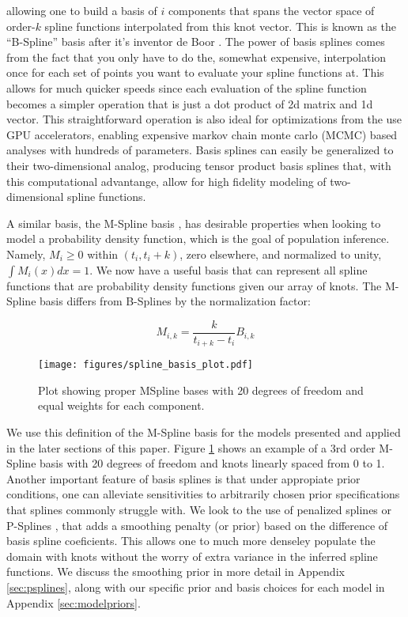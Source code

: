 \noindent allowing one to build a basis of $i$ components that spans the vector space of order-$k$ spline functions interpolated 
from this knot vector. This is known as the ``B-Spline'' basis after it's inventor de Boor \cite{deBoor78}. The power of basis splines
comes from the fact that you only have to do the, somewhat expensive, interpolation once for each set of points you want to evaluate your
spline functions at. This allows for much quicker speeds since each evaluation of the spline function becomes a simpler operation that is just
a dot product of 2d matrix and 1d vector. This straightforward operation is also ideal for optimizations from the use GPU accelerators, 
enabling expensive markov chain monte carlo (MCMC) based analyses with hundreds of parameters. Basis splines can easily be generalized to 
their two-dimensional analog, producing tensor product basis splines that, with this computational advantange, allow for high fidelity
modeling of two-dimensional spline functions.

A similar basis, the M-Spline basis \citep{monotone_regression_splines}, has desirable properties when looking to model a probability density function, 
which is the goal of population inference. Namely, $M_i \geq 0$ within $(t_i, t_i+k)$, zero elsewhere, and normalized to unity, $\int M_i(x)dx = 1$. We now have
a useful basis that can represent all spline functions that are probability density functions given our array of knots. The M-Spline basis differs 
from B-Splines by the normalization factor:

\begin{equation}\label{eq:MB_SplineRelation}
M_{i,k} = \frac{k}{t_{i+k} - t_i} B_{i,k}
\end{equation}

\begin{figure}[ht!]
        \texttt{[image: figures/spline\_basis\_plot.pdf]}
        \caption{Plot showing proper MSpline bases with 20 degrees of freedom and equal weights for each component.}
        \label{fig:spline_basis}
\end{figure}

\noindent We use this definition of the M-Spline basis for the models presented and applied in the later sections of this paper. 
Figure \ref{fig:spline_basis} shows an example of a 3rd order M-Spline basis with 20 degrees of freedom and knots linearly spaced from 0 to 1.
Another important feature of basis splines is that under appropiate prior conditions, one can alleviate sensitivities to arbitrarily 
chosen prior specifications that splines commonly struggle with. We look to the use of penalized splines or P-Splines \cite{eilers2021practical,BayesianPSplines,Jullion2007RobustSO}, 
that adds a smoothing penalty (or prior) based on the difference of basis spline coeficients. This allows one to much more denseley populate
the domain with knots without the worry of extra variance in the inferred spline functions. We discuss the smoothing prior in more detail 
in Appendix \ref{sec:psplines}, along with our specific prior and basis choices for each model in Appendix \ref{sec:modelpriors}.